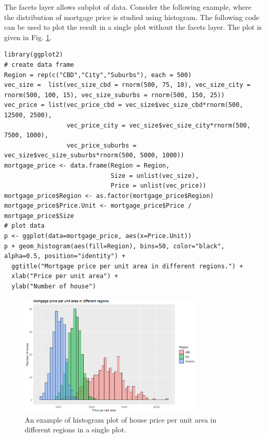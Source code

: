 The facets layer allows subplot of data. Consider the following example, where the distribution of mortgage price is studied using histogram. The following code can be used to plot the result in a single plot without the facets layer. The plot is given in Fig. \ref{ch:r1:fig:mortgage_histogram_demo}.
\begin{lstlisting}
library(ggplot2)
# create data frame
Region = rep(c("CBD","City","Suburbs"), each = 500)
vec_size =  list(vec_size_cbd = rnorm(500, 75, 10), vec_size_city = rnorm(500, 100, 15), vec_size_suburbs = rnorm(500, 150, 25))
vec_price = list(vec_price_cbd = vec_size$vec_size_cbd*rnorm(500, 12500, 2500),
                 vec_price_city = vec_size$vec_size_city*rnorm(500, 7500, 1000),
                 vec_price_suburbs = vec_size$vec_size_suburbs*rnorm(500, 5000, 1000))
mortgage_price <- data.frame(Region = Region,
                             Size = unlist(vec_size),
                             Price = unlist(vec_price))
mortgage_price$Region <- as.factor(mortgage_price$Region)
mortgage_price$Price.Unit <- mortgage_price$Price / mortgage_price$Size
# plot data
p <- ggplot(data=mortgage_price, aes(x=Price.Unit))
p + geom_histogram(aes(fill=Region), bins=50, color="black", alpha=0.5, position="identity") +
  ggtitle("Mortgage price per unit area in different regions.") +
  xlab("Price per unit area") +
  ylab("Number of house")
\end{lstlisting}

\begin{figure}
	\centering
	\includegraphics[width=250pt]{chapters/ch-r/figures/mortgage_histogram_demo.png}
	\caption{An example of histogram plot of house price per unit area in different regions in a single plot.} \label{ch:r1:fig:mortgage_histogram_demo}
\end{figure}

